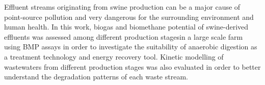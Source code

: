 Effluent streams originating from swine production can be a major cause of point-source pollution and very dangerous for the surrounding environment and human health. In this work, biogas and biomethane potential of swine-derived effluents was assessed among different production stagesin a large scale farm using BMP assays in order to investigate the suitability of anaerobic digestion as a treatment technology and energy recovery tool. Kinetic modelling of wastewaters from different production stages was also evaluated in order to better understand the degradation patterns of each waste stream.